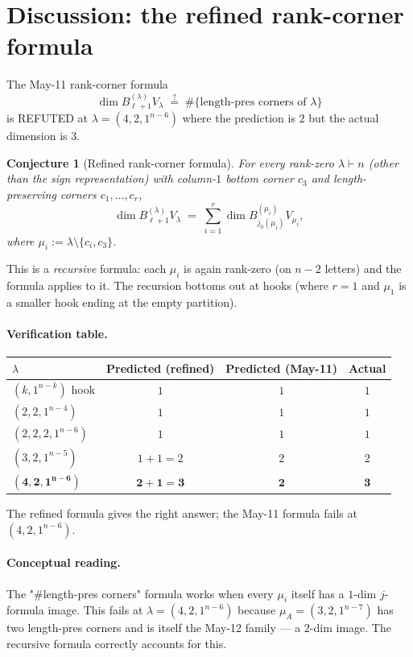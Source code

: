\documentclass[11pt]{article}
\newtheorem{conjecture}[theorem]{Conjecture}
\theoremstyle{definition}
\begin{document}
\section{Discussion: the refined rank-corner formula}\label{sec:disc}

The May-11 rank-corner formula
\[
   \dim B_{\ell+1}^{(\lambda)} V_\lambda \;\stackrel{?}{=}\;
   \#\{\text{length-pres corners of } \lambda\}
\]
is REFUTED at $\lambda = (4, 2, 1^{n-6})$ where the prediction is
$2$ but the actual dimension is $3$.

\begin{conjecture}[Refined rank-corner formula]\label{conj:refined}
For every rank-zero $\lambda \vdash n$ (other than the sign
representation) with column-$1$ bottom corner $c_3$ and
length-preserving corners $c_1, \ldots, c_r$,
\[
   \dim B_{\ell+1}^{(\lambda)} V_\lambda
   \;=\;
   \sum_{i=1}^{r}
   \dim B_{j_0(\mu_i)}^{(\mu_i)} V_{\mu_i},
\]
where $\mu_i := \lambda \setminus \{c_i, c_3\}$.
\end{conjecture}

This is a \emph{recursive} formula: each $\mu_i$ is again rank-zero
(on $n - 2$ letters) and the formula applies to it. The recursion
bottoms out at hooks (where $r = 1$ and $\mu_1$ is a smaller hook
ending at the empty partition).

\paragraph{Verification table.}
\begin{center}
\begin{tabular}{lccc}
\toprule
$\lambda$ & Predicted (refined) & Predicted (May-11) & Actual\\
\midrule
$(k, 1^{n-k})$ hook        & $1$       & $1$ & $1$\\
$(2, 2, 1^{n-4})$          & $1$       & $1$ & $1$\\
$(2, 2, 2, 1^{n-6})$       & $1$       & $1$ & $1$\\
$(3, 2, 1^{n-5})$          & $1 + 1 = 2$ & $2$ & $2$\\
$\boldsymbol{(4, 2, 1^{n-6})}$ & $\boldsymbol{2 + 1 = 3}$ & $\boldsymbol{2}$ & $\boldsymbol{3}$\\
\bottomrule
\end{tabular}
\end{center}
The refined formula gives the right answer; the May-11 formula
fails at $(4, 2, 1^{n-6})$.

\paragraph{Conceptual reading.}
The "$\#$length-pres corners" formula works when every $\mu_i$
itself has a $1$-dim $j$-formula image. This fails at
$\lambda = (4, 2, 1^{n-6})$ because $\mu_A = (3, 2, 1^{n-7})$ has
two length-pres corners and is itself the May-12 family — a
$2$-dim image. The recursive formula correctly accounts for this.
\end{document}
